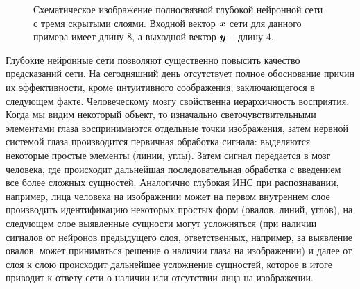 \documentclass[a4paper,12pt,russian]{article} %
\begin{document}
\begin{figure}[t!]
	\caption{
		Схематическое изображение полносвязной глубокой нейронной сети с тремя скрытыми слоями. Входной вектор $\bm{x}$ сети для данного примера имеет длину $8$, а выходной вектор $\bm{y}$ -- длину $4$.
        }
        \label{fig:nn_deep}
\end{figure}

Глубокие нейронные сети позволяют существенно повысить качество предсказаний сети.
На сегодняшний день отсутствует полное обоснование причин их эффективности, кроме интуитивного соображения, заключающегося в следующем факте.
Человеческому мозгу свойственна иерархичность восприятия.
Когда мы видим некоторый объект, то изначально светочувствительными элементами глаза воспринимаются отдельные точки изображения, затем нервной системой глаза производится первичная обработка сигнала: выделяются некоторые простые элементы (линии, углы).
Затем сигнал передается в мозг человека, где происходит дальнейшая последовательная обработка с введением все более сложных сущностей.
Аналогично глубокая ИНС при распознавании, например, лица человека на изображении может на первом внутреннем слое производить идентификацию некоторых простых форм (овалов, линий, углов), на следующем слое выявленные сущности могут усложняться (при наличии сигналов от нейронов предыдущего слоя, ответственных, например, за выявление овалов, может приниматься решение о наличии глаза на изображении) и далее от слоя к слою происходит дальнейшее усложнение сущностей, которое в итоге приводит к ответу сети о наличии или отсутствии лица на изображении.
\end{document}
